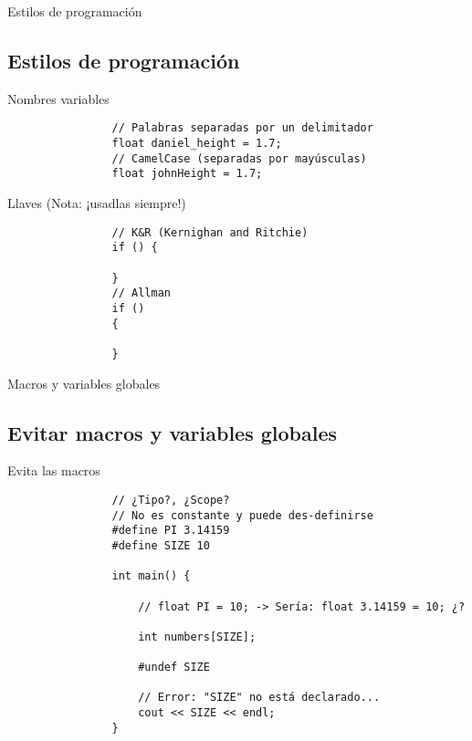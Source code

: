\documentclass{beamer}
\newcommand{\normalSizeItem}[1] {
  \normalsize{\item #1}
}
\newcommand{\smallCite}[1]{
	\begin{small}
		\cite{#1}	
	\end{small}
}
\begin{document}
		\begin{frame}[fragile]{Estilos de programación}	
			\subsection{Estilos de programación}
			\begin{itemize}
			
				\normalSizeItem{Nombres variables \smallCite{namingConvention}}
				\begin{lstlisting}
				// Palabras separadas por un delimitador
				float daniel_height = 1.7;
				// CamelCase (separadas por mayúsculas)
				float johnHeight = 1.7;
				\end{lstlisting}
				
				\normalSizeItem{Llaves (Nota: ¡usadlas siempre!) \smallCite{indentationStyle}}
				\begin{lstlisting}
				// K&R (Kernighan and Ritchie)
				if () {
				
				}
				// Allman
				if ()
				{
				
				}
				\end{lstlisting}
				
			\end{itemize}
		\end{frame}
		
		\begin{frame}[fragile]{Macros y variables globales}	
			\subsection{Evitar macros y variables globales}
			\begin{itemize}
			
				\normalSizeItem{Evita las macros}
				\begin{lstlisting}
				// ¿Tipo?, ¿Scope?
				// No es constante y puede des-definirse
				#define PI 3.14159
				#define SIZE 10
				
				int main() {
					
					// float PI = 10; -> Sería: float 3.14159 = 10; ¿?
					
					int numbers[SIZE];
					
					#undef SIZE
					
					// Error: "SIZE" no está declarado...
					cout << SIZE << endl;
				}
				\end{lstlisting}
				
			\end{itemize}
		\end{frame}
		
\end{document}
